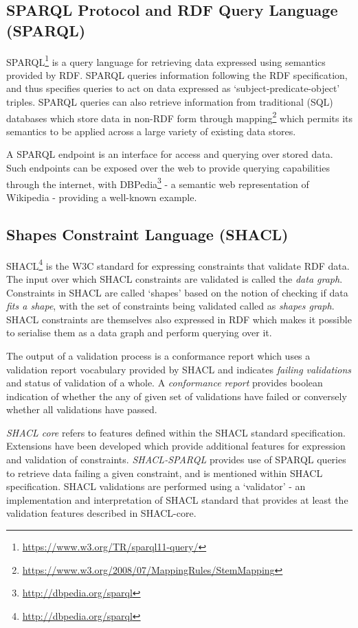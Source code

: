 \subsection{SPARQL Protocol and RDF Query Language (SPARQL)}
SPARQL\footnote{\url{https://www.w3.org/TR/sparql11-query/}} is a query language for retrieving data expressed using semantics provided by RDF.
SPARQL queries information following the RDF specification, and thus specifies queries to act on data expressed as `subject-predicate-object' triples.
SPARQL queries can also retrieve information from traditional (SQL) databases which store data in non-RDF form through mapping\footnote{\url{https://www.w3.org/2008/07/MappingRules/StemMapping}} which permits its semantics to be applied across a large variety of existing data stores.

A SPARQL endpoint is an interface for access and querying over stored data. Such endpoints can be exposed over the web to provide querying capabilities through the internet, with DBPedia\footnote{\url{http://dbpedia.org/sparql}} - a semantic web representation of Wikipedia - providing a well-known example.

\subsection{Shapes Constraint Language (SHACL)}
SHACL\footnote{\url{http://dbpedia.org/sparql}} is the W3C standard for expressing constraints that validate RDF data. The input over which SHACL constraints are validated is called the \textit{data graph}.
Constraints in SHACL are called `shapes' based on the notion of checking if data \textit{fits a shape}, with the set of constraints being validated called as \textit{shapes graph}.
SHACL constraints are themselves also expressed in RDF which makes it possible to serialise them as a data graph and perform querying over it.

The output of a validation process is a conformance report which uses a validation report vocabulary provided by SHACL and indicates \textit{failing validations} and status of validation of a whole. A \textit{conformance report} provides boolean indication of whether the any of given set of validations have failed or conversely whether all validations have passed.

\textit{SHACL core} refers to features defined within the SHACL standard specification. Extensions have been developed which provide additional features for expression and validation of constraints. \textit{SHACL-SPARQL} provides use of SPARQL queries to retrieve data failing a given constraint, and is mentioned within SHACL specification.
SHACL validations are performed using a `validator' - an implementation and interpretation of SHACL standard that provides at least the validation features described in SHACL-core.

